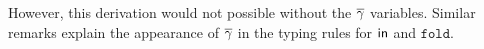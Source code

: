 \documentclass[runningheads]{llncs}
\begin{document}
\vspace*{0.1in}

\noindent
However, this derivation would not possible without the $\overline{\gamma}$
variables.  Similar remarks explain the appearance of $\overline{\gamma}$ in
the typing rules for $\mathsf{in}$ and $\mathtt{fold}$.


\begin{comment}
\begin{figure*}
\resizebox{0.35\linewidth}{!}{
\begin{minipage}[t]{0.5\textwidth}
\[\begin{array}{l}
\mathtt{reversePTree : \forall \{A : Set\}  \rightarrow PTree\; A
  \rightarrow PTree \;A}\\  
\mathtt{reversePTree \; \{A\} = foldPTree \; \{A\}\; \{PTree\}}\\
\hspace*{1.3in} \mathtt{pleaf}\\
\hspace*{1.3in} \mathtt{( \lambda p \rightarrow pnode\; (mapPTree\;
  swap\; p) )}\\  
\\
\mathtt{foldPTree : \forall \{A : Set\} \rightarrow \{F : Set \rightarrow Set \}
  \rightarrow}\\
\hspace*{0.8in} \mathtt{( \{B : Set\} \rightarrow B \rightarrow F\;B) \rightarrow}\\
\hspace*{0.8in} \mathtt{(\{B : Set\} \rightarrow F\;(B \times B)
  \rightarrow F \;B) \rightarrow}\\
\hspace*{0.8in}\mathtt{PTree \;A \rightarrow F\;A}\\
\mathtt{foldPTree\; n\; c\; (pleaf\; x) = n \;x}\\
\mathtt{foldPTree\; n\; c \;(pnode\; p) = c\; (foldPTree \;n \;c \;p)}\\
\\
\mathtt{mapPTree : \forall \{A\, B : Set\} \rightarrow (A \rightarrow B)
  \rightarrow PTree\; A \rightarrow PTree\; B}\\ 
\mathtt{mapPTree \;f\; (pleaf \;x) = pleaf\; (f\; x)}\\
\mathtt{mapPTree\; f \;(pnode\; p) =}\\
\hspace*{0.7in}  \mathtt{pnode\; (mapPTree \;(\lambda p
  \rightarrow (f (\pi_1 \,p), f (\pi_2\,p)))\; p)}\\ 

\end{comment}
\end{document}

